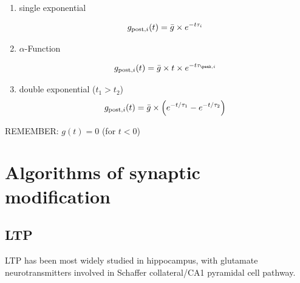 \begin{enumerate}
  \item single exponential

\begin{equation}
g_{{\text{post}},i}(t) = \bar{g} \times e^{-t\tau_i}
\end{equation}  

  \item $\alpha$-Function
  
\begin{equation}
g_{\post,i}(t)  = \bar{g} \times t \times e^{-t\tau_{\peak,i}}
\end{equation} 

  \item double exponential ($t_1> t_2$)  
\begin{equation}
g_{{\text{post}},i}(t)  = \bar{g} \times \left( e^{-t/\tau_1} - e^{-t/\tau_2} \right)
\end{equation}  
\end{enumerate} 
REMEMBER: $g(t) = 0$ (for $t< 0$)

\section{Algorithms of synaptic modification}


\subsection{LTP}

LTP has been most widely studied in hippocampus, with glutamate
neurotransmitters involved in Schaffer collateral/CA1 pyramidal cell pathway.

